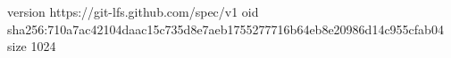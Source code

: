 version https://git-lfs.github.com/spec/v1
oid sha256:710a7ac42104daac15c735d8e7aeb1755277716b64eb8e20986d14c955cfab04
size 1024
